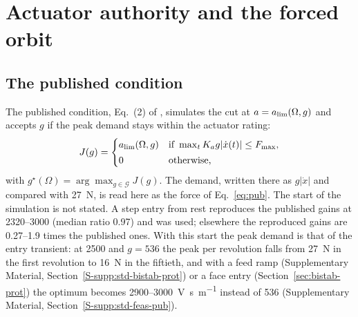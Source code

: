 \section{Actuator authority and the forced orbit}\label{sec:feasibility}

\subsection{The published condition}\label{sec:feas-pub}

The published condition, Eq.~(2) of \citet{ozsoy2026robust}, simulates the cut at $a=a_{\lim}(\Omega,g)$ and accepts $g$ if the peak demand stays within the actuator rating:
\begin{equation}\label{eq:pub}
  J(g)=\begin{cases}a_{\lim}(\Omega,g) & \text{if }\max_tK_ag\lvert\dot x(t)\rvert\le F_{\max},\\[2pt] 0 & \text{otherwise,}\end{cases}
\end{equation}
with $g^\star(\Omega)=\arg\max_{g\in\mathcal G}J(g)$. The demand, written there as $g\lvert\dot x\rvert$ and compared with \SI{27}{\newton}, is read here as the force of Eq.~\eqref{eq:pub}. The start of the simulation is not stated. A step entry from rest reproduces the published gains at \SIrange{2320}{3000}{\rpm} (median ratio 0.97) and was used; elsewhere the reproduced gains are 0.27--1.9 times the published ones. With this start the peak demand is that of the entry transient: at \SI{2500}{\rpm} and $g=536$ the peak per revolution falls from \SI{27}{\newton} in the first revolution to \SI{16}{\newton} in the fiftieth, and with a feed ramp (Supplementary Material, Section~\ref{S-supp:std-bistab-prot}) or a face entry (Section~\ref{sec:bistab-prot}) the optimum becomes 2900--\SI{3000}{\volt\second\per\metre} instead of 536 (Supplementary Material, Section~\ref{S-supp:std-feas-pub}).

